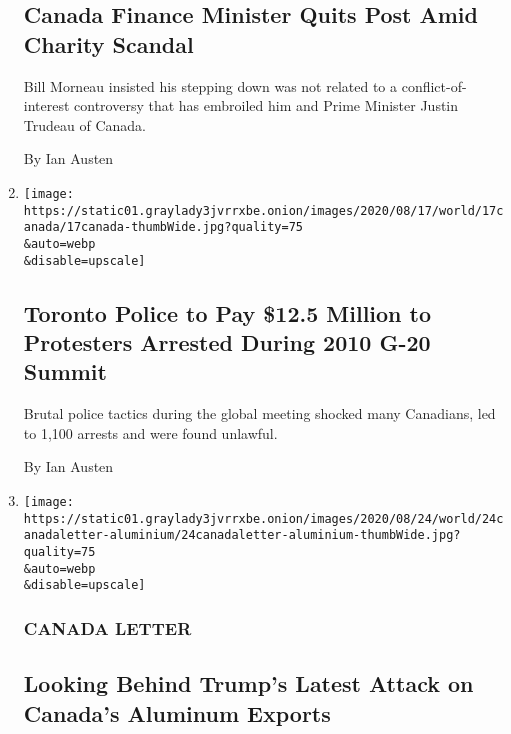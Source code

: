 \begin{enumerate}
  \hypertarget{canada-finance-minister-quits-post-amid-charity-scandal}{%
  \subsection{Canada Finance Minister Quits Post Amid Charity
  Scandal}\label{canada-finance-minister-quits-post-amid-charity-scandal}}

  Bill Morneau insisted his stepping down was not related to a
  conflict-of-interest controversy that has embroiled him and Prime
  Minister Justin Trudeau of Canada.

  By Ian Austen
\item
  \href{/2020/08/17/world/canada/toronto-g20-settlement.html}{}

  \texttt{[image: https://static01.graylady3jvrrxbe.onion/images/2020/08/17/world/17canada/17canada-thumbWide.jpg?quality=75\\\&auto=webp\\\&disable=upscale]}

  \hypertarget{toronto-police-to-pay-125-million-to-protesters-arrested-during-2010-g-20-summit}{%
  \subsection{Toronto Police to Pay \$12.5 Million to Protesters
  Arrested During 2010 G-20
  Summit}\label{toronto-police-to-pay-125-million-to-protesters-arrested-during-2010-g-20-summit}}

  Brutal police tactics during the global meeting shocked many
  Canadians, led to 1,100 arrests and were found unlawful.

  By Ian Austen
\item
  \href{/2020/08/14/world/canada/trump-canada-aluminum-exports.html}{}

  \texttt{[image: https://static01.graylady3jvrrxbe.onion/images/2020/08/24/world/24canadaletter-aluminium/24canadaletter-aluminium-thumbWide.jpg?quality=75\\\&auto=webp\\\&disable=upscale]}

  \hypertarget{canada-letter-3}{%
  \subsubsection{CANADA LETTER}\label{canada-letter-3}}

  \hypertarget{looking-behind-trumps-latest-attack-on-canadas-aluminum-exports}{%
  \subsection{Looking Behind Trump's Latest Attack on Canada's Aluminum
  Exports}\label{looking-behind-trumps-latest-attack-on-canadas-aluminum-exports}}


\end{enumerate}
